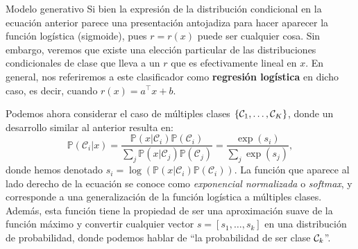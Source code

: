 \documentclass[handout, 9pt]{beamer}
\begin{document}
\begin{frame}{Modelo generativo}
Si bien la expresión de la distribución condicional en la ecuación anterior parece una presentación antojadiza para hacer aparecer la  función logística (sigmoide), pues $r=r(x)$ puede ser cualquier cosa. Sin embargo, veremos que existe una elección particular de las distribuciones condicionales de clase que lleva a un $r$ que es efectivamente lineal en $x$. En general, nos  referiremos a este clasificador como \textbf{regresión logística} en dicho caso, es decir, cuando $r(x) = a^\top x  + b$. \pause

Podemos ahora considerar el caso de múltiples clases $\{{\mathcal C}_1,\ldots,{\mathcal C}_K\}$, donde un desarrollo similar al anterior resulta en:  
\begin{equation*}
  \mathbb{P}(\mathcal{C}_i | x) = \frac{\mathbb{P}(x | \mathcal{C}_i)\mathbb{P}(\mathcal{C}_i)}{\sum_{j}\mathbb{P}(x | \mathcal{C}_j)\mathbb{P}(\mathcal{C}_j)} = \frac{\exp(s_i)}{\sum_{j}\exp(s_j)},\label{eq:softmax1}  
\end{equation*}
\pause
donde hemos denotado $s_i = \log\left(\mathbb{P}(x | \mathcal{C}_i)\mathbb{P}(\mathcal{C}_i)\right)$. La función que aparece al lado derecho de la ecuación se conoce como \emph{exponencial normalizada} o \emph{softmax}, y corresponde a una generalización de la función logística a múltiples clases. \\Además, esta función tiene la propiedad de ser una aproximación suave de la función máximo y convertir cualquier vector $s=[s_1,\ldots,s_k]$ en una distribución de probabilidad, donde podemos hablar de ``la probabilidad de ser clase ${\mathcal C}_k$''.


\end{frame}

\begin{frame}
  \titlepage
\end{frame}


\end{document}
